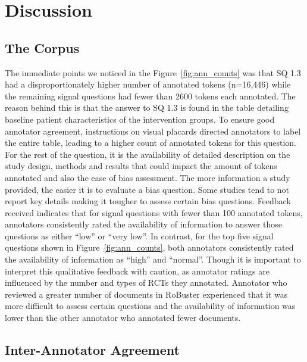 \documentclass[sn-mathphys,Numbered]{sn-jnl}%
\theoremstyle{thmstyleone}%
\theoremstyle{thmstyletwo}%
\theoremstyle{thmstylethree}%
\begin{document}
\section{Discussion}
\label{sec:discussion}
%
%
%
\subsection{The Corpus}
\label{disc:corpus}
%
The immediate points we noticed in the Figure~\ref{fig:ann_counts} was that SQ 1.3 had a disproportionately higher number of annotated tokens (n=16,446) while the remaining signal questions had fewer than 2600 tokens each annotated.
The reason behind this is that the answer to SQ 1.3 is found in the table detailing baseline patient characteristics of the intervention groups.
To ensure good annotator agreement, instructions on visual placards directed annotators to label the entire table, leading to a higher count of annotated tokens for this question.
For the rest of the question, it is the availability of detailed description on the study design, methods and results that could impact the amount of tokens annotated and also the ease of bias assessment.
The more information a study provided, the easier it is to evaluate a bias question.
Some studies tend to not report key details making it tougher to assess certain bias questions.
Feedback received indicates that for signal questions with fewer than 100 annotated tokens, annotators consistently rated the availability of information to answer those questions as either ``low'' or ``very low''.
In contrast, for the top five signal questions shown in Figure~\ref{fig:ann_counts}, both annotators consistently rated the availability of information as ``high'' and ``normal''.
Though it is important to interpret this qualitative feedback with caution, as annotator ratings are influenced by the number and types of RCTs they annotated.
Annotator who reviewed a greater number of documents in RoBuster experienced that it was more difficult to assess certain questions and the availability of information was lower than the other annotator who annotated fewer documents.
%
%
%
\subsection{Inter-Annotator Agreement}
\label{disc:iaa}
%
\end{document}
